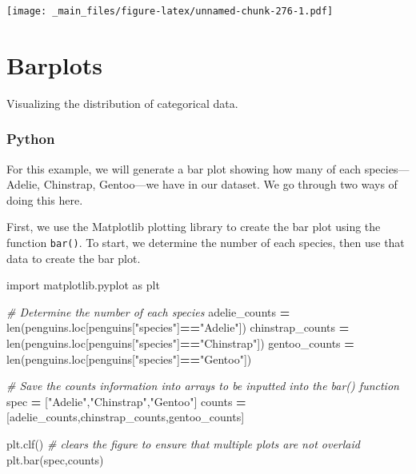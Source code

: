 \documentclass[
]{book}
\newenvironment{Shaded}{\begin{snugshade}}{\end{snugshade}}
\newcommand{\BuiltInTok}[1]{#1}
\newcommand{\CommentTok}[1]{\textcolor[rgb]{0.56,0.35,0.01}{\textit{#1}}}
\newcommand{\ImportTok}[1]{#1}
\newcommand{\NormalTok}[1]{#1}
\newcommand{\OperatorTok}[1]{\textcolor[rgb]{0.81,0.36,0.00}{\textbf{#1}}}
\newcommand{\StringTok}[1]{\textcolor[rgb]{0.31,0.60,0.02}{#1}}
\begin{document}
\texttt{[image: \_main\_files/figure-latex/unnamed-chunk-276-1.pdf]}

\hypertarget{barplots}{%
\section{Barplots}\label{barplots}}

Visualizing the distribution of categorical data.

\hypertarget{python-42}{%
\subsubsection*{Python}\label{python-42}}

For this example, we will generate a bar plot showing how many of each species---Adelie, Chinstrap, Gentoo---we have in our dataset. We go through two ways of doing this here.

First, we use the Matplotlib plotting library to create the bar plot using the function \texttt{bar()}. To start, we determine the number of each species, then use that data to create the bar plot.

\begin{Shaded}
\begin{Highlighting}[]
\ImportTok{import}\NormalTok{ matplotlib.pyplot }\ImportTok{as}\NormalTok{ plt }

\CommentTok{\# Determine the number of each species}
\NormalTok{adelie\_counts }\OperatorTok{=} \BuiltInTok{len}\NormalTok{(penguins.loc[penguins[}\StringTok{"species"}\NormalTok{]}\OperatorTok{==}\StringTok{"Adelie"}\NormalTok{])}
\NormalTok{chinstrap\_counts }\OperatorTok{=} \BuiltInTok{len}\NormalTok{(penguins.loc[penguins[}\StringTok{"species"}\NormalTok{]}\OperatorTok{==}\StringTok{"Chinstrap"}\NormalTok{])}
\NormalTok{gentoo\_counts }\OperatorTok{=} \BuiltInTok{len}\NormalTok{(penguins.loc[penguins[}\StringTok{"species"}\NormalTok{]}\OperatorTok{==}\StringTok{"Gentoo"}\NormalTok{])}

\CommentTok{\# Save the counts information into arrays to be inputted into the bar() function}
\NormalTok{spec }\OperatorTok{=}\NormalTok{ [}\StringTok{"Adelie"}\NormalTok{,}\StringTok{"Chinstrap"}\NormalTok{,}\StringTok{"Gentoo"}\NormalTok{]}
\NormalTok{counts }\OperatorTok{=}\NormalTok{ [adelie\_counts,chinstrap\_counts,gentoo\_counts]}

\NormalTok{plt.clf() }\CommentTok{\# clears the figure to ensure that multiple plots are not overlaid}
\NormalTok{plt.bar(spec,counts)}
\end{Highlighting}
\end{Shaded}
\end{document}
